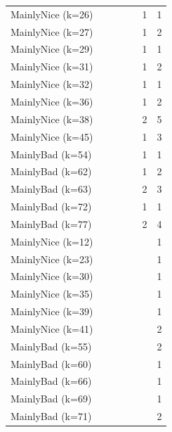 \documentclass[journal,10pt,twoside]{IEEEtran}
\begin{document}
\begin{table}[ht]
\begin{tabular}{l|cccccc}
        MainlyNice (k=26)    &     &     &      &      &    1 &    1 \\
        MainlyNice (k=27)    &     &     &      &      &    1 &    2 \\
        MainlyNice (k=29)    &     &     &      &      &    1 &    1 \\
        MainlyNice (k=31)    &     &     &      &      &    1 &    2 \\
        MainlyNice (k=32)    &     &     &      &      &    1 &    1 \\
        MainlyNice (k=36)    &     &     &      &      &    1 &    2 \\
        MainlyNice (k=38)    &     &     &      &      &    2 &    5 \\
        MainlyNice (k=45)    &     &     &      &      &    1 &    3 \\
        MainlyBad (k=54)     &     &     &      &      &    1 &    1 \\
        MainlyBad (k=62)     &     &     &      &      &    1 &    2 \\
        MainlyBad (k=63)     &     &     &      &      &    2 &    3 \\
        MainlyBad (k=72)     &     &     &      &      &    1 &    1 \\
        MainlyBad (k=77)     &     &     &      &      &    2 &    4 \\%
        MainlyNice (k=12)    &     &     &      &      &      &    1 \\
        MainlyNice (k=23)    &     &     &      &      &      &    1 \\
        MainlyNice (k=30)    &     &     &      &      &      &    1 \\
        MainlyNice (k=35)    &     &     &      &      &      &    1 \\
        MainlyNice (k=39)    &     &     &      &      &      &    1 \\
        MainlyNice (k=41)    &     &     &      &      &      &    2 \\
        MainlyBad (k=55)     &     &     &      &      &      &    2 \\
        MainlyBad (k=60)     &     &     &      &      &      &    1 \\
        MainlyBad (k=66)     &     &     &      &      &      &    1 \\
        MainlyBad (k=69)     &     &     &      &      &      &    1 \\
        MainlyBad (k=71)     &     &     &      &      &      &    2 \\

\end{tabular}
\end{table}
\end{document}
